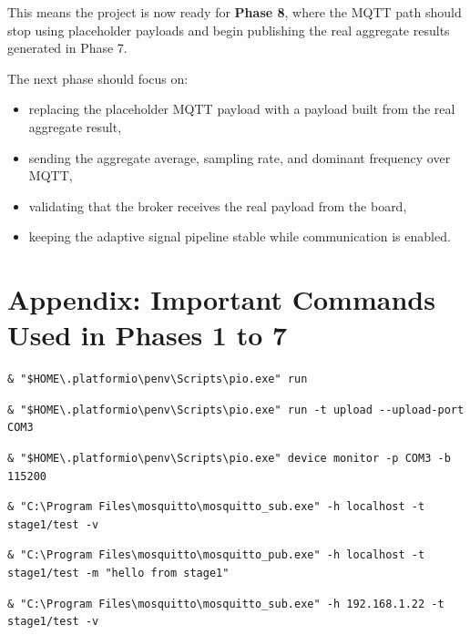 \documentclass[12pt,a4paper]{article}
\begin{document}
This means the project is now ready for \textbf{Phase 8}, where the MQTT path
should stop using placeholder payloads and begin publishing the real aggregate
results generated in Phase 7.

The next phase should focus on:

\begin{itemize}
    \item replacing the placeholder MQTT payload with a payload built from the
    real aggregate result,
    \item sending the aggregate average, sampling rate, and dominant frequency
    over MQTT,
    \item validating that the broker receives the real payload from the board,
    \item keeping the adaptive signal pipeline stable while communication is
    enabled.
\end{itemize}

\section{Appendix: Important Commands Used in Phases 1 to 7}

\begin{lstlisting}
& "$HOME\.platformio\penv\Scripts\pio.exe" run
\end{lstlisting}

\begin{lstlisting}
& "$HOME\.platformio\penv\Scripts\pio.exe" run -t upload --upload-port COM3
\end{lstlisting}

\begin{lstlisting}
& "$HOME\.platformio\penv\Scripts\pio.exe" device monitor -p COM3 -b 115200
\end{lstlisting}

\begin{lstlisting}
& "C:\Program Files\mosquitto\mosquitto_sub.exe" -h localhost -t stage1/test -v
\end{lstlisting}

\begin{lstlisting}
& "C:\Program Files\mosquitto\mosquitto_pub.exe" -h localhost -t stage1/test -m "hello from stage1"
\end{lstlisting}

\begin{lstlisting}
& "C:\Program Files\mosquitto\mosquitto_sub.exe" -h 192.168.1.22 -t stage1/test -v
\end{lstlisting}
\end{document}
